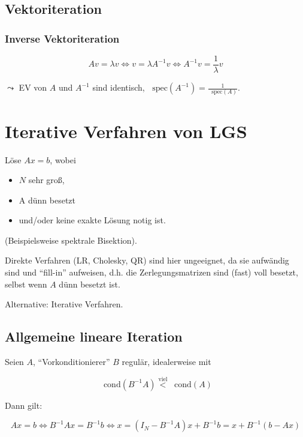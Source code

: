 \documentclass[a4paper, 14pt]{article}
\newcommand*\Spektrum{\mathop{}\!\mathrm{spec}}
\newcommand*\cond{\mathop{}\!\mathrm{cond}}
\begin{document}
	\subsection{Vektoriteration}

	\subsubsection{Inverse Vektoriteration}

	\begin{equation}
		A v = \lambda v \Leftrightarrow v = \lambda A^{-1} v \Leftrightarrow A^{-1} v = \frac{1}{\lambda} v
	\end{equation}

	$\leadsto$ EV von $A$ und $A^{-1}$ sind identisch, $\Spektrum(A^{-1}) = \frac{1}{\Spektrum(A)}$.

	\section{Iterative Verfahren von LGS}

	Löse $Ax = b$, wobei

	\begin{itemize}
		\item $N$ sehr groß,
		\item A dünn besetzt
		\item und/oder keine exakte Lösung notig ist.
	\end{itemize}

	(Beispielsweise spektrale Bisektion).

	Direkte Verfahren (LR, Cholesky, QR) sind hier ungeeignet, da sie aufwändig sind und \enquote{fill-in} aufweisen, d.h. die Zerlegungsmatrizen sind (fast) voll besetzt, selbst wenn $A$ dünn besetzt ist.

	Alternative: Iterative Verfahren.

	\subsection{Allgemeine lineare Iteration}

	Seien $A$, \enquote{Vorkonditionierer} $B$ regulär, idealerweise mit

	\begin{equation}
		\cond(B^{-1} A) \stackrel{\textrm{viel}}{<} \cond(A)
	\end{equation}

	Dann gilt:

	\begin{equation}
		A x = b \Leftrightarrow B^{-1} A x = B^{-1} b \Leftrightarrow x = (I_N - B^{-1} A)x + B^{-1} b = x + B^{-1} (b - A x)
	\end{equation}
\end{document}
